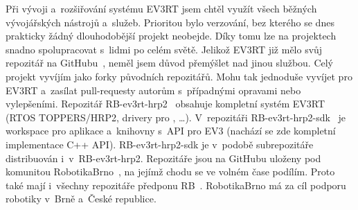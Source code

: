 Při vývoji a~rozšiřování systému EV3RT jsem chtěl využít všech běžných vývojářských nástrojů a~služeb.
% 
% 
Prioritou bylo verzování, bez kterého se dnes prakticky žádný dlouhodobější projekt neobejde. Díky tomu lze na projektech snadno spolupracovat s~lidmi po celém světě.
Jelikož EV3RT již mělo svůj repozitář na GitHubu~\cite{legoProgramingPlatform_EV3RT-github}, neměl jsem důvod přemýšlet nad jinou službou.
Celý projekt vyvíjím jako forky původních repozitářů. Mohu tak jednoduše vyvíjet pro EV3RT a~zasílat pull-requesty autorům s~případnými opravami nebo vylepšeními.
% 
% 
%
%
%
%
Repozitář RB-ev3rt-hrp2~\cite{RB-ev3rt-hrp2-github} obsahuje kompletní systém EV3RT (RTOS TOPPERS/HRP2, drivery pro \brick{}, \dots). 
% 
% 
V~repozitáři RB-ev3rt-hrp2-sdk~\cite{RB-ev3rt-hrp2-sdk-github} je workspace pro aplikace a~knihovny s~API pro EV3 (nachází se zde kompletní implementace C++ API). RB-ev3rt-hrp2-sdk je v~podobě subrepozitáře distribuován i~v~RB-ev3rt-hrp2. Repozitáře jsou na GitHubu uloženy pod komunitou RobotikaBrno~\cite{RobotikaBrno-web}, na jejímž chodu se ve volném čase podílím. Proto také mají i~všechny repozitáře předponu RB~\cite{RoboticsBrno-github}. RobotikaBrno má za cíl podporu robotiky v~Brně a~České republice.
% 
% 
%
%
% 
% 
%
%


